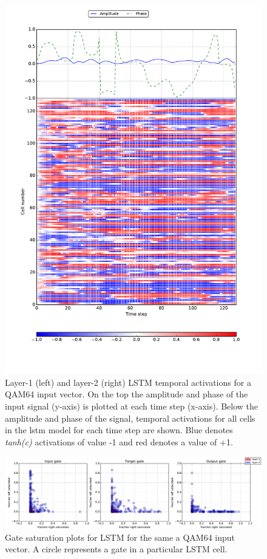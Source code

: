 \begin{figure}[!t]
\includegraphics[width=1\columnwidth]{figures/layer_2_new1.pdf}
\caption{Layer-1 (left) and layer-2 (right) LSTM temporal activations for a QAM64 input vector. On the top the amplitude and phase of the input signal (y-axis) is plotted at each time step (x-axis). Below the amplitude and phase of the signal, temporal activations for all cells in the \ac{lstm} model for each time step are shown. Blue denotes \textit{tanh(c)} activations of value -1 and red denotes a value of +1.} 
\label{fig_activations}
\end{figure}

\begin{figure}[!t]
\centering
\includegraphics[width=2\columnwidth]{figures/gate_sat.pdf}
\caption{Gate saturation plots for LSTM for the same a QAM64 input vector. A circle represents a gate in a particular LSTM cell.} 
\label{fig_gatesat}
\end{figure}



